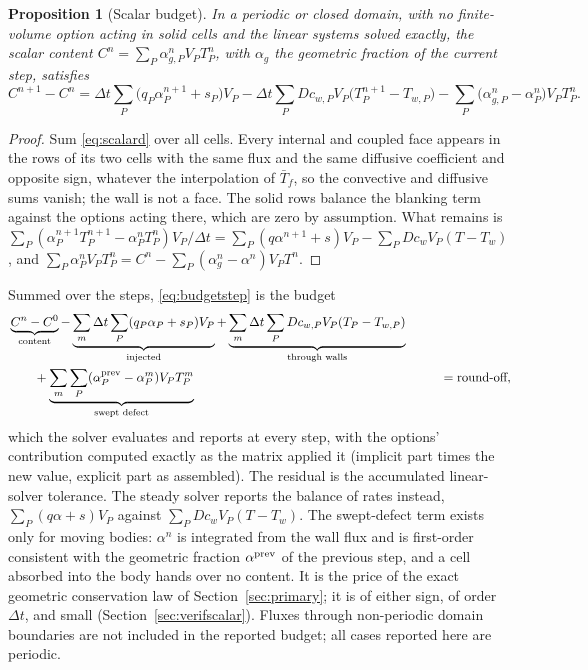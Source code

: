 \documentclass[11pt,a4paper]{article}
\newtheorem{proposition}{Proposition}
\theoremstyle{remark}
\newcommand{\dt}{\Delta t}
\begin{document}
\begin{proposition}[Scalar budget]
\label{prop:budget}
In a periodic or closed domain, with no finite-volume option acting in solid cells and the
linear systems solved exactly, the scalar content $C^n=\sum_P\alpha^n_{g,P}V_PT^n_P$, with
$\alpha_g$ the geometric fraction of the current step, satisfies
\begin{equation}
C^{n+1}-C^n=\dt\sum_P\big(q_P\alpha^{n+1}_P+s_P\big)V_P
-\dt\sum_PDc_{w,P}V_P\big(T^{n+1}_P-T_{w,P}\big)
-\sum_P\big(\alpha^n_{g,P}-\alpha^n_P\big)V_PT^n_P
.
\label{eq:budgetstep}
\end{equation}
\end{proposition}
\begin{proof}
Sum \eqref{eq:scalard} over all cells. Every internal and coupled face appears in the rows of
its two cells with the same flux and the same diffusive coefficient and opposite sign, whatever
the interpolation of $\bar T_f$, so the convective and diffusive sums vanish; the wall is not a
face. The solid rows balance the blanking term against the options acting there, which are zero
by assumption. What remains is
$\sum_P(\alpha^{n+1}_PT^{n+1}_P-\alpha^n_PT^n_P)V_P/\dt=\sum_P(q\alpha^{n+1}+s)V_P-
\sum_PDc_wV_P(T-T_w)$, and $\sum_P\alpha^n_PV_PT^n_P=C^n-\sum_P(\alpha^n_g-\alpha^n)V_PT^n$.
\end{proof}

Summed over the steps, \eqref{eq:budgetstep} is the budget
\begin{equation}
\begin{aligned}
&\underbrace{C^n-C^0}_{\text{content}}
-\underbrace{\sum_m\dt\sum_P(q_P\alpha_P+s_P)V_P}_{\text{injected}}
+\underbrace{\sum_m\dt\sum_PDc_{w,P}V_P(T_P-T_{w,P})}_{\text{through walls}}\\
&\qquad+\underbrace{\sum_m\sum_P(\alpha^{\rm prev}_P-\alpha^m_P)V_PT^m_P}_{\text{swept defect}}
&\qquad=\text{round-off},
\end{aligned}
\label{eq:budget}
\end{equation}
which the solver evaluates and reports at every step, with the options' contribution computed
exactly as the matrix applied it (implicit part times the new value, explicit part as
assembled). The residual is the accumulated linear-solver tolerance. The steady solver reports
the balance of rates instead, $\sum_P(q\alpha+s)V_P$ against $\sum_PDc_wV_P(T-T_w)$.
The swept-defect term exists only for moving bodies: $\alpha^n$ is integrated from the wall
flux and is first-order consistent with the geometric fraction $\alpha^{\rm prev}$ of the
previous step, and a cell absorbed into the body hands over no content. It is the price of the
exact geometric conservation law of Section~\ref{sec:primary}; it is of either sign, of
order $\dt$, and small (Section~\ref{sec:verifscalar}).
Fluxes through non-periodic domain boundaries are not included in the reported budget;
all cases reported here are periodic.
\end{document}
